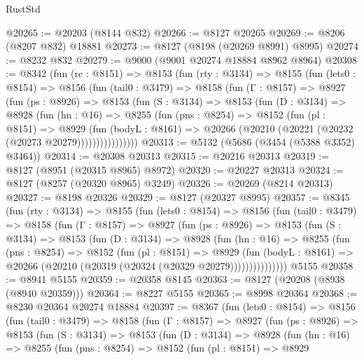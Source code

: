 \begin{lexlean}{RustStd}
\begin{coremodule}
@20265 := @20203 (@8144 @832)
@20266 := @8127 @20265
@20269 := @8206 (@8207 @832) @18881
@20273 := @8127 (@8198 (@20269 @8991) @8995)
@20274 := @8232 @832
@20279 := @9000 (@9001 @20274 @18884 @8962 @8964)
@20308 := @8342
    (fun (rc : @8151) =>
    @8153
      (fun (rty : @3134) =>
      @8155
        (fun (lets0 : @8154) =>
        @8156
          (fun (tail0 : @3479) =>
          @8158
            (fun (Γ : @8157) =>
            @8927
              (fun (ps : @8926) =>
              @8153
                (fun (S : @3134) =>
                @8153
                  (fun (D : @3134) =>
                  @8928
                    (fun (hn : @16) =>
                    @8255
                      (fun (pns : @8254) =>
                      @8152
                        (fun (pl : @8151) =>
                        @8929
                          (fun (bodyL : @8161) =>
                          @20266 (@20210 (@20221 (@20232 (@20273 @20279))))))))))))))))
@20313 := @5132 (@5686 (@3454 (@5388 @3352) @3464))
@20314 := @20308 @20313
@20315 := @20216 @20313
@20319 := @8127 (@8951 (@20315 @8965) @8972)
@20320 := @20227 @20313
@20324 := @8127 (@8257 (@20320 @8965) @3249)
@20326 := @20269 (@8214 @20313)
@20327 := @8198 @20326
@20329 := @8127 (@20327 @8995)
@20357 := @8345
    (fun (rty : @3134) =>
    @8155
      (fun (lets0 : @8154) =>
      @8156
        (fun (tail0 : @3479) =>
        @8158
          (fun (Γ : @8157) =>
          @8927
            (fun (ps : @8926) =>
            @8153
              (fun (S : @3134) =>
              @8153
                (fun (D : @3134) =>
                @8928
                  (fun (hn : @16) =>
                  @8255
                    (fun (pns : @8254) =>
                    @8152
                      (fun (pl : @8151) =>
                      @8929
                        (fun (bodyL : @8161) =>
                        @20266 (@20210 (@20319 (@20324 (@20329 @20279)))))))))))))))
    @5155
@20358 := @8941 @5155
@20359 := @20358 @8145
@20363 := @8127 (@20208 (@8938 (@8940 @20359)))
@20364 := @8227 @5155
@20365 := @8998 @20364
@20368 := @8230 @20364 @20274 @18884
@20397 := @8367
    (fun (lets0 : @8154) =>
    @8156
      (fun (tail0 : @3479) =>
      @8158
        (fun (Γ : @8157) =>
        @8927
          (fun (ps : @8926) =>
          @8153
            (fun (S : @3134) =>
            @8153
              (fun (D : @3134) =>
              @8928
                (fun (hn : @16) =>
                @8255
                  (fun (pns : @8254) =>
                  @8152
                    (fun (pl : @8151) =>
                    @8929

\end{coremodule}
\end{lexlean}
